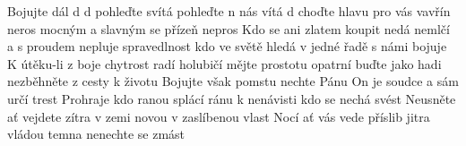\begin{TEXT}{Bojujte dál}
\REFREN   {}  d \NL
{}  d \NL
{}pohleďte   svítá \NL
{}pohleďte n  nás vítá \NL
{}  d 
\SLOKA {} choďte  hlavu  \NL
{} pro vás vavřín neros \NL
{} mocným  a slavným  \NL
{} se přízeň nepros 
\SLOKA Kdo se ani zlatem koupit nedá \NL
nemlčí a s proudem nepluje \NL
spravedlnost kdo ve světě hledá \NL
v jedné řadě s námi bojuje 
\SLOKA K útěku-li z boje chytrost radí \NL
holubičí mějte prostotu \NL
opatrní buďte jako hadi \NL
nezběhněte z cesty k životu 
\SLOKA Bojujte však pomstu nechte Pánu \NL
On je soudce a sám určí trest \NL
Prohraje kdo ranou splácí ránu \NL
k nenávisti kdo se nechá svést \pagebreak
\SLOKA Neusněte ať vejdete zítra \NL
v zemi novou v zaslíbenou vlast \NL
Nocí ať vás vede příslib jitra \NL
vládou temna nenechte se zmást 
\end{TEXT}
